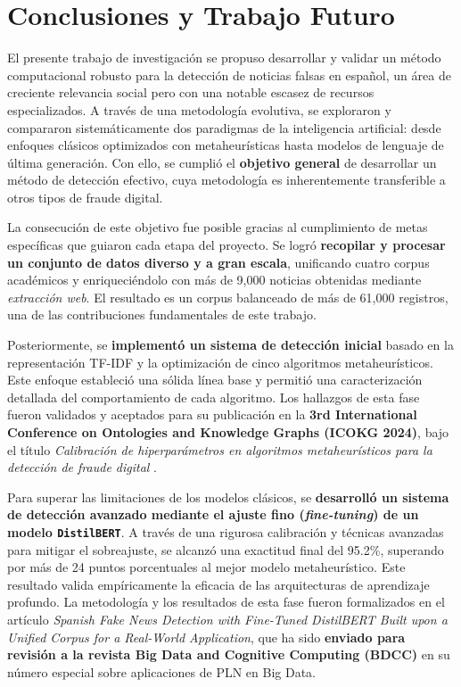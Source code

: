 \chapter{Conclusiones y Trabajo Futuro}
\label{cap:Conclusiones}

El presente trabajo de investigación se propuso desarrollar y validar un método computacional robusto para la detección de noticias falsas en español, un área de creciente relevancia social pero con una notable escasez de recursos especializados. A través de una metodología evolutiva, se exploraron y compararon sistemáticamente dos paradigmas de la inteligencia artificial: desde enfoques clásicos optimizados con metaheurísticas hasta modelos de lenguaje de última generación. Con ello, se cumplió el \textbf{objetivo general} de desarrollar un método de detección efectivo, cuya metodología es inherentemente transferible a otros tipos de fraude digital.

La consecución de este objetivo fue posible gracias al cumplimiento de metas específicas que guiaron cada etapa del proyecto. Se logró \textbf{recopilar y procesar un conjunto de datos diverso y a gran escala}, unificando cuatro corpus académicos y enriqueciéndolo con más de 9,000 noticias obtenidas mediante \textit{extracción web}. El resultado es un corpus balanceado de más de 61,000 registros, una de las contribuciones fundamentales de este trabajo.

Posteriormente, se \textbf{implementó un sistema de detección inicial} basado en la representación TF-IDF y la optimización de cinco algoritmos metaheurísticos. Este enfoque estableció una sólida línea base y permitió una caracterización detallada del comportamiento de cada algoritmo. Los hallazgos de esta fase fueron validados y aceptados para su publicación en la \textbf{3rd International Conference on Ontologies and Knowledge Graphs (ICOKG 2024)}, bajo el título \textit{Calibración de hiperparámetros en algoritmos metaheurísticos para la detección de fraude digital} \cite{hurtado2024calibracion}.

Para superar las limitaciones de los modelos clásicos, se \textbf{desarrolló un sistema de detección avanzado mediante el ajuste fino (\textit{fine-tuning}) de un modelo \texttt{DistilBERT}}. A través de una rigurosa calibración y técnicas avanzadas para mitigar el sobreajuste, se alcanzó una exactitud final del 95.2\%, superando por más de 24 puntos porcentuales al mejor modelo metaheurístico. Este resultado valida empíricamente la eficacia de las arquitecturas de aprendizaje profundo. La metodología y los resultados de esta fase fueron formalizados en el artículo \textit{Spanish Fake News Detection with Fine-Tuned DistilBERT Built upon a Unified Corpus for a Real-World Application}, que ha sido \textbf{enviado para revisión a la revista Big Data and Cognitive Computing (BDCC)} en su número especial sobre aplicaciones de PLN en Big Data.

